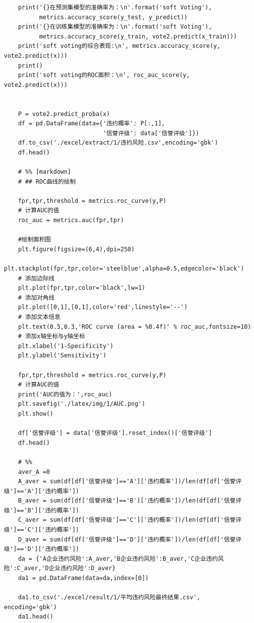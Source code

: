 \documentclass[UTF8]{ctexart}
\begin{document}
\begin{lstlisting}
	print('{}在预测集模型的准确率为：\n'.format('soft Voting'),
		  metrics.accuracy_score(y_test, y_predict))
	print('{}在训练集模型的准确率为：\n'.format('soft Voting'),
		  metrics.accuracy_score(y_train, vote2.predict(x_train)))
	print('soft voting的综合表现:\n', metrics.accuracy_score(y, vote2.predict(x)))
	print()
	print('soft voting的ROC面积：\n', roc_auc_score(y, vote2.predict(x)))
	

	P = vote2.predict_proba(x)
	df = pd.DataFrame(data={'违约概率': P[:,1],
							'信誉评级': data['信誉评级']})
	df.to_csv('./excel/extract/1/违约风险.csv',encoding='gbk')
	df.head()
	
	# %% [markdown]
	# ## ROC曲线的绘制

	fpr,tpr,threshold = metrics.roc_curve(y,P)
	# 计算AUC的值
	roc_auc = metrics.auc(fpr,tpr)
	
	#绘制面积图
	plt.figure(figsize=(6,4),dpi=250)
	plt.stackplot(fpr,tpr,color='steelblue',alpha=0.5,edgecolor='black')
	# 添加边际线
	plt.plot(fpr,tpr,color='black',lw=1)
	# 添加对角线
	plt.plot([0,1],[0,1],color='red',linestyle='--')
	# 添加文本信息
	plt.text(0.5,0.3,'ROC curve (area = %0.4f)' % roc_auc,fontsize=10)
	# 添加x轴坐标与y轴坐标
	plt.xlabel('1-Specificity')
	plt.ylabel('Sensitivity')
	
	fpr,tpr,threshold = metrics.roc_curve(y,P)
	# 计算AUC的值
	print('AUC的值为：',roc_auc)
	plt.savefig('./latex/img/1/AUC.png')
	plt.show()
	
	df['信誉评级'] = data['信誉评级'].reset_index()['信誉评级']
	df.head()
	
	# %%
	aver_A =0
	A_aver = sum(df[df['信誉评级']=='A']['违约概率'])/len(df[df['信誉评级']=='A']['违约概率'])
	B_aver = sum(df[df['信誉评级']=='B']['违约概率'])/len(df[df['信誉评级']=='B']['违约概率'])
	C_aver = sum(df[df['信誉评级']=='C']['违约概率'])/len(df[df['信誉评级']=='C']['违约概率'])
	D_aver = sum(df[df['信誉评级']=='D']['违约概率'])/len(df[df['信誉评级']=='D']['违约概率'])
	da = {'A企业违约风险':A_aver,'B企业违约风险':B_aver,'C企业违约风险':C_aver,'D企业违约风险':D_aver}
	da1 = pd.DataFrame(data=da,index=[0])
	
	da1.to_csv('./excel/result/1/平均违约风险最终结果.csv', encoding='gbk')
	da1.head()

\end{lstlisting}
\end{document}
